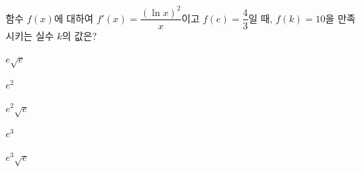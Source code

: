 함수 $f(x)$에 대하여 $f'(x)=\dfrac{(\ln x)^2}{x}$이고 $f(e)=\dfrac{4}{3}$일 때, $f(k)=10$을 만족시키는 실수 $k$의 값은?
\begin{choices32}{\rule[-3ex]{0pt}{8ex}$e\sqrt{e}$}{\rule[-3ex]{0pt}{8ex}$e^2$}{\rule[-3ex]{0pt}{8ex}$e^2\sqrt{e}$}{\rule[-3ex]{0pt}{8ex}$e^3$}{\rule[-3ex]{0pt}{8ex}$e^3\sqrt{e}$}\end{choices32}
